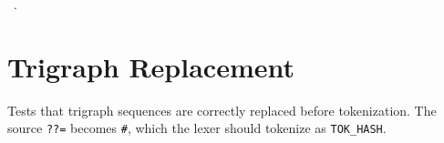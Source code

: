 \documentclass[11pt,a4paper,twoside,openright,DIV=15]{scrbook}
\theoremstyle{definition}
\theoremstyle{plain}
\theoremstyle{remark}
\begin{document}
\begin{flushleft}
\begin{minipage}{\linewidth}
\vspace{-1.5ex}
\footnotesize
\begin{list}{}{\setlength{\itemsep}{-\parsep}\setlength{\itemindent}{-\leftmargin}}
\item \NWtxtMacroRefIn\ .

\item{}
\end{list}
\end{minipage}\vspace{4ex}
\end{flushleft}
\section{Trigraph Replacement}

Tests that trigraph sequences are correctly replaced before
tokenization.  The source \texttt{??=} becomes \texttt{\#},
which the lexer should tokenize as \texttt{TOK\_HASH}.
\end{document}
